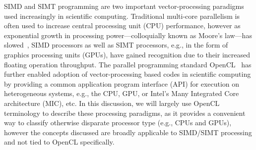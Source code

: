 \documentclass[12pt,number,sort&compress,preprint]{elsarticle}
\begin{document}
SIMD and SIMT programming are two important vector-processing paradigms used increasingly in scientific computing.
Traditional multi-core parallelism is often used to increase central processing unit (CPU) performance, however as exponential growth in processing power---colloquially known as Moore's law---has slowed~\cite{khan2018science}, SIMD processors as well as SIMT processors, e.g., in the form of graphics processing units (GPUs), have gained recognition due to their increased floating operation throughput.
The parallel programming standard OpenCL~\cite{stone2010opencl} has further enabled adoption of vector-processing based codes in scientific computing by providing a common application program interface (API) for execution on heterogeneous systems, e.g., the CPU, GPU, or Intel's Many Integrated Core architecture (MIC), etc.
In this discussion, we will largely use OpenCL terminology to describe these processing paradigms, as it provides a convenient way to classify otherwise disparate processor type (e.g., CPUs and GPUs), however the concepts discussed are broadly applicable to SIMD\slash SIMT processing and not tied to OpenCL specifically.
\end{document}
